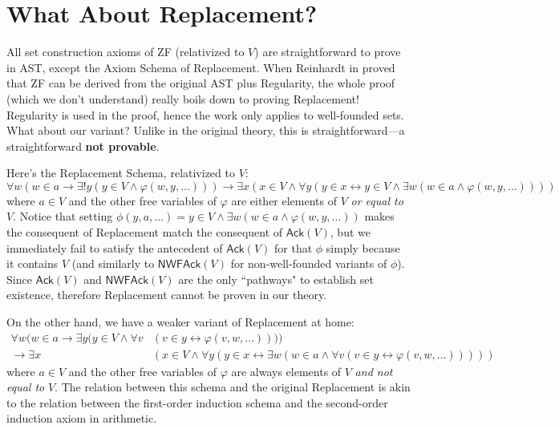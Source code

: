 \documentclass{article}
\begin{document}
\section{What About Replacement?}
All set construction axioms of ZF (relativized to $V$) are straightforward to prove in AST, except the Axiom Schema of Replacement. When Reinhardt in \cite{reinhardt} proved that ZF can be derived from the original AST plus Regularity, the whole proof (which we don't understand) really boils down to proving Replacement! Regularity is used in the proof, hence the work only applies to well-founded sets. What about our variant? Unlike in the original theory, this is straightforward---a straightforward \textbf{not provable}.

Here's the Replacement Schema, relativized to $V$:
$$\forall w(w \in a \rightarrow \exists! y(y \in V \wedge \varphi(w, y, \ldots))) \rightarrow \exists x(x \in V \wedge \forall y(y \in x \leftrightarrow y \in V \wedge \exists w(w \in a \wedge \varphi(w, y, \ldots))))$$
where $a \in V$ and the other free variables of $\varphi$ are either elements of $V$ \textit{or equal to} $V$. Notice that setting $\phi(y, a, \ldots) = y \in V \wedge \exists w( w \in a \wedge \varphi(w, y, \ldots))$ makes the consequent of Replacement match the consequent of $\textsf{Ack}(V)$, but we immediately fail to satisfy the antecedent of $\textsf{Ack}(V)$ for that $\phi$ simply because it contains $V$ (and similarly to $\textsf{NWFAck}(V)$ for non-well-founded variants of $\phi$). Since $\textsf{Ack}(V)$ and $\textsf{NWFAck}(V)$ are the only ``pathways" to establish set existence, therefore Replacement cannot be proven in our theory.

On the other hand, we have a weaker variant of Replacement at home:
\begin{align*}
    \forall w(w \in a \rightarrow \exists y(y \in V \wedge \forall v &(v \in y \leftrightarrow \varphi(v, w, \ldots)))) \\ \rightarrow \exists x &(x \in V \wedge \forall y(y \in x \leftrightarrow \exists w(w \in a \wedge \forall v (v \in y \leftrightarrow \varphi(v, w, \ldots)))))
\end{align*}
where $a \in V$ and the other free variables of $\varphi$ are always elements of $V$ \textit{and not equal to} $V$. The relation between this schema and the original Replacement is akin to the relation between the first-order induction schema and the second-order induction axiom in arithmetic.



\end{document}
